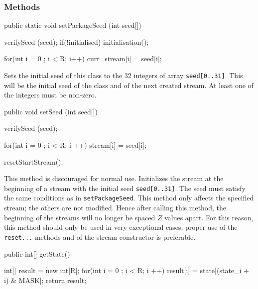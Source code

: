 \subsubsection* {Methods}
\begin{code}
   public static void setPackageSeed (int seed[]) \begin{hide} {
      verifySeed (seed);
      if(!initialised)
         initialisation();

      for(int i = 0 ; i < R; i++)
         curr_stream[i] = seed[i];
   } \end{hide}
\end{code}
\begin{tabb} Sets the initial seed of this class to the 32
  integers of array \texttt{seed[0..31]}.
  This will be the initial seed of the class and of the next created stream.
  At least one of the integers must be non-zero.
\end{tabb}
\begin{htmlonly}
\end{htmlonly}
\begin{code}

   public void setSeed (int seed[]) \begin{hide} {
      verifySeed (seed);

      for(int i = 0 ; i <  R; i ++)
         stream[i] = seed[i];

      resetStartStream();
   } \end{hide}
\end{code}
\begin{tabb} This method is discouraged for normal use.
  Initializes the stream at the beginning of a stream with the initial
  seed \texttt{seed[0..31]}. The seed must satisfy the same
  conditions as in \texttt{setPackageSeed}.
  This method only affects the specified stream; the others are not
  modified.  Hence after calling this method, the beginning of the streams
  will no longer be spaced $Z$ values apart.
  For this reason, this method should only be used in very exceptional cases;
  proper use of the \texttt{reset...} methods and of the stream constructor is
  preferable.
\end{tabb}
\begin{htmlonly}
\end{htmlonly}
\begin{code}

   public int[] getState() \begin{hide} {
      int[] result = new int[R];
      for(int i = 0 ; i < R; i ++)
         result[i] = state[(state_i + i) & MASK];
      return result;
   } \end{hide}
\end{code}
